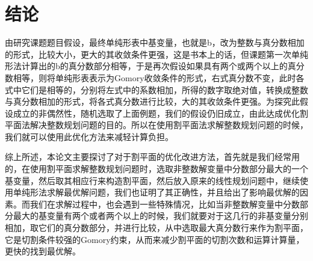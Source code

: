 	{\centering\chapter{结论}}
	
	由研究课题题目假设，最终单纯形表中基变量，也就是b，改为整数与真分数相加的形式，比较大小，更大的其收敛条件更强，这是书本上的话，但课题第一次单纯形法计算出的b的真分数部分相等，于是再次假设如果具有两个或两个以上的真分数相等，则将单纯形表表示为Gomory收敛条件的形式，右式真分数不变，此时各式中它们是相等的，分别将左式中的系数相加，所得的数字取绝对值，转换成整数与真分数相加的形式，将各式真分数进行比较，大的其收敛条件更强。为探究此假设成立的非偶然性，随机选取了上面例题，我们的假设仍旧成立，由此达成优化割平面法解决整数规划问题的目的。所以在使用割平面法求解整数规划问题的时候，我们就可以使用此优化方法来减轻计算负担。
	
综上所述，本论文主要探讨了对于割平面的优化改进方法，首先就是我们经常用的，在使用割平面求解整数规划问题时，选取非整数解变量中分数部分最大的一个基变量，然后取其相应行来构造割平面，然后放入原来的线性规划问题中，继续使用单纯形法求解最优解问题，我们也证明了其正确性，并且给出了影响最优解的因素。而我们在求解过程中，也会遇到一些特殊情况，比如当非整数解变量中分数部分最大的基变量有两个或者两个以上的时候，我们就要对于这几行的非基变量分别相加，取它们的真分数部分，并进行比较，从中选取最大真分数行来作为割平面，它是切割条件较强的Gomory约束，从而来减少割平面的切割次数和运算计算量，更快的找到最优解。


